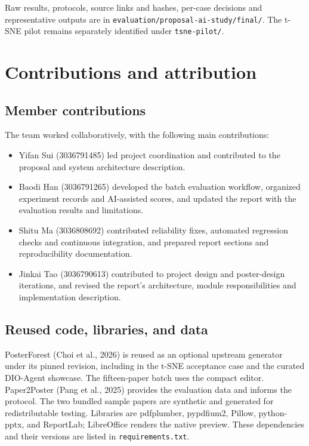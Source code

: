 \documentclass{article}
\begin{document}
Raw results, protocols, source links and hashes, per-case decisions and representative outputs are in \texttt{evaluation/proposal-ai-study/final/}. The t-SNE pilot remains separately identified under \texttt{tsne-pilot/}.

\section{Contributions and attribution}

\subsection{Member contributions}
The team worked collaboratively, with the following main contributions:

\begin{itemize}
  \item Yifan Sui (3036791485) led project coordination and contributed to the proposal and system architecture description.
  \item Baodi Han (3036791265) developed the batch evaluation workflow, organized experiment records and AI-assisted scores, and updated the report with the evaluation results and limitations.
  \item Shitu Ma (3036808692) contributed reliability fixes, automated regression checks and continuous integration, and prepared report sections and reproducibility documentation.
  \item Jinkai Tao (3036790613) contributed to project design and poster-design iterations, and revised the report's architecture, module responsibilities and implementation description.
\end{itemize}

\subsection{Reused code, libraries, and data}
PosterForest (Choi et al., 2026) is reused as an optional upstream generator under its pinned revision, including in the t-SNE acceptance case and the curated DIO-Agent showcase. The fifteen-paper batch uses the compact editor. Paper2Poster (Pang et al., 2025) provides the evaluation data and informs the protocol. The two bundled sample papers are synthetic and generated for redistributable testing. Libraries are pdfplumber, pypdfium2, Pillow, python-pptx, and ReportLab; LibreOffice renders the native preview. These dependencies and their versions are listed in \texttt{requirements.txt}.
\end{document}
